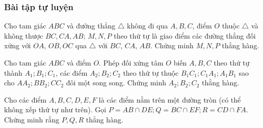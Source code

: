 \subsubsection{Bài tập tự luyện}
\begin{bt}%
	Cho tam giác $ABC$ và đường thẳng $\triangle $ không đi qua $A, B, C$, điểm $O$ thuộc $\triangle $ và không thược $BC, CA, AB$; $M, N, P$ theo thứ tự là giao điểm các đường thẳng đối xứng với $OA$, $OB, OC$ qua $\triangle $ với $BC$, $CA$, $AB$. Chứng minh $M, N, P$ thẳng hàng.
\end{bt}
\begin{bt}%
	Cho tam giác $ABC$ và điểm $O$. Phép đối xứng tâm $O$ biến $A, B, C$ theo thứ tự thành $A_1; B_1; C_1$, các điểm $A_2; B_2; C_2$ theo thứ tự thuộc $B_1C_1; C_1A_1; A_1B_1$ sao cho $AA_2; BB_2; CC_2$ đôi một song song. Chứng minh $A_2; B_2; C_2$ thằng hàng.  
\end{bt}
\begin{bt}%
	Cho các điểm $A, B, C, D, E, F$ là các điểm nằm trên một đường tròn (có thể không xếp thứ tự như trên). Gọi $P=AB\cap DE; Q=BC\cap EF; R=CD\cap FA$. Chứng minh rằng $P, Q, R$ thẳng hàng.  		
\end{bt}
